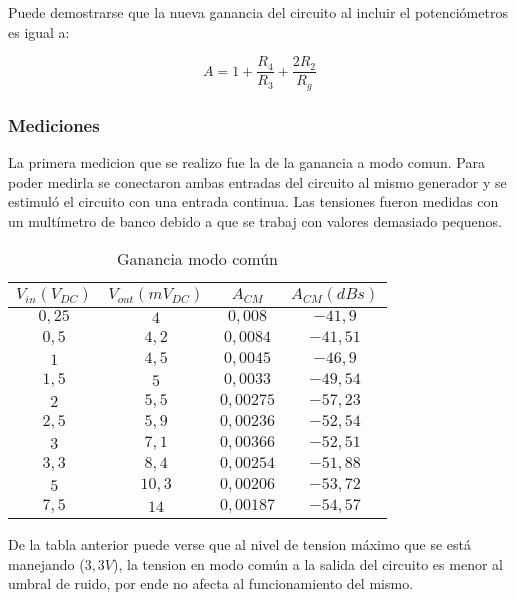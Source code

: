 \documentclass[a4paper]{article}
\begin{document}
Puede demostrarse que la nueva ganancia del circuito al incluir el potenciómetros es igual a:


\begin{equation}
\boxed{A = 1 + \frac{R_4}{R_3} + \frac{2R_2}{R_g}}
\end{equation}



\subsubsection{Mediciones}
La primera medicion que se realizo fue la de la ganancia a modo comun. Para poder medirla se conectaron ambas entradas del circuito al mismo generador y se estimul\'o el circuito con una entrada continua. Las tensiones fueron medidas con un mult\'imetro de banco debido a que se trabaj con valores demasiado pequenos.


\begin{table}[H]
\centering
\begin{tabular}{cccc}\hline
$V_{in}(V_{DC})$ & $V_{out}(mV_{DC})$ & $A_{CM}$ & $A_{CM} (dBs)$ \\
\hline
$0,25$ & $4$ & $0,008$ & $-41,9$ \\
$0,5$   & $4,2$  & $0,0084$ & $-41,51$ \\
$1$  & $4,5$ & $0,0045$ & $-46,9$\\
$1,5$  & $5$ & $0,0033$ & $-49,54$\\
$2$  & $5,5$ & $0,00275$ & $-57,23$\\
$2,5$  & $5,9$ & $0,00236$ & $-52,54$\\
$3$  & $7,1$ & $0,00366$ & $-52,51$\\
$3,3$  & $8,4$ & $0,00254$ & $-51,88$\\
$5$  & $10,3$ & $0,00206$ & $-53,72$\\
$7,5$  & $14$ & $0,00187$ & $-54,57$\\ \hline
\end{tabular}
\caption{Ganancia modo com\'un}
\label{table:ganancia_comun}
\end{table}


De la tabla anterior puede verse que al nivel de tension m\'aximo que se est\'a manejando ($3,3V$), la tension en modo com\'un a la salida del circuito es menor al umbral de ruido, por ende no afecta al funcionamiento del mismo. 
\end{document}
